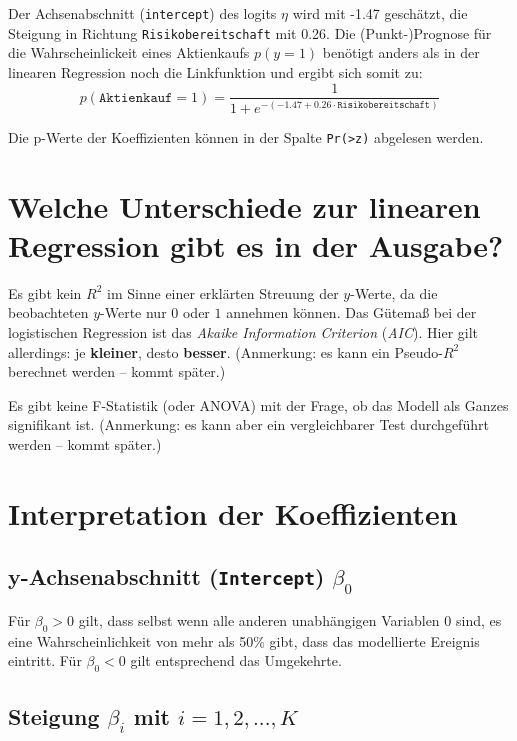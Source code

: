 \documentclass[12pt,ngerman,]{book}
\begin{document}
Der Achsenabschnitt (\texttt{intercept}) des logits \(\eta\) wird mit
-1.47 geschätzt, die Steigung in Richtung \texttt{Risikobereitschaft}
mit 0.26. Die (Punkt-)Prognose für die Wahrscheinlickeit eines
Aktienkaufs \(p(y=1)\) benötigt anders als in der linearen Regression
noch die Linkfunktion und ergibt sich somit zu:
\[p(\texttt{Aktienkauf}=1)=\frac{1}{1+e^{-(-1.47 + 0.26 \cdot \texttt{Risikobereitschaft})}}\]

Die p-Werte der Koeffizienten können in der Spalte
\texttt{Pr(\textgreater{}\textbar{}z\textbar{})} abgelesen werden.

\section{Welche Unterschiede zur linearen Regression gibt es in der
Ausgabe?}\label{welche-unterschiede-zur-linearen-regression-gibt-es-in-der-ausgabe}

Es gibt kein \(R^2\) im Sinne einer erklärten Streuung der \(y\)-Werte,
da die beobachteten \(y\)-Werte nur \(0\) oder \(1\) annehmen können.
Das Gütemaß bei der logistischen Regression ist das \emph{Akaike
Information Criterion} (\emph{AIC}). Hier gilt allerdings: je
\textbf{kleiner}, desto \textbf{besser}. (Anmerkung: es kann ein
Pseudo-\(R^2\) berechnet werden -- kommt später.)

Es gibt keine F-Statistik (oder ANOVA) mit der Frage, ob das Modell als
Ganzes signifikant ist. (Anmerkung: es kann aber ein vergleichbarer Test
durchgeführt werden -- kommt später.)

\section{Interpretation der
Koeffizienten}\label{interpretation-der-koeffizienten}

\subsection{\texorpdfstring{y-Achsenabschnitt (\texttt{Intercept})
\(\beta_0\)}{y-Achsenabschnitt (Intercept) \textbackslash{}beta\_0}}\label{y-achsenabschnitt-intercept-beta_0}

Für \(\beta_0>0\) gilt, dass selbst wenn alle anderen unabhängigen
Variablen \(0\) sind, es eine Wahrscheinlichkeit von mehr als 50\% gibt,
dass das modellierte Ereignis eintritt. Für \(\beta_0<0\) gilt
entsprechend das Umgekehrte.

\subsection{\texorpdfstring{Steigung \(\beta_i\) mit
\(i=1,2,...,K\)}{Steigung \textbackslash{}beta\_i mit i=1,2,...,K}}\label{steigung-beta_i-mit-i12...k}
\end{document}
